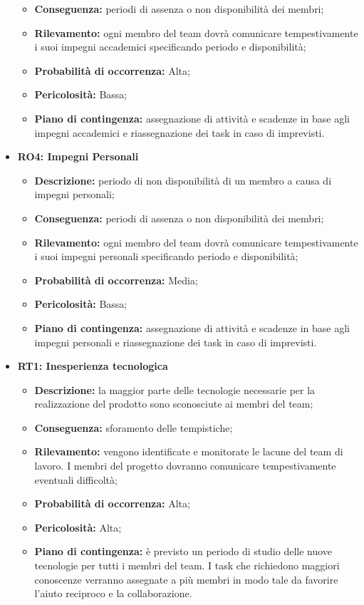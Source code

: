 \begin{itemize}
\begin{itemize}
		\item \textbf{Conseguenza:} periodi di assenza o non disponibilità dei membri;
		\item \textbf{Rilevamento:} ogni membro del team dovrà comunicare tempestivamente i suoi impegni accademici specificando periodo e disponibilità;
		\item \textbf{Probabilità di occorrenza:} Alta;
		\item \textbf{Pericolosità:} Bassa;
		\item \textbf{Piano di contingenza:} assegnazione di attività e scadenze in base agli impegni accademici e riassegnazione dei task in caso di imprevisti.
	\end{itemize}
	\item \textbf{RO4: Impegni Personali}
	\begin{itemize}
		\item \textbf{Descrizione:} periodo di non disponibilità di un membro a causa di impegni personali;
		\item \textbf{Conseguenza:} periodi di assenza o non disponibilità dei membri;
		\item \textbf{Rilevamento:} ogni membro del team dovrà comunicare tempestivamente i suoi impegni personali specificando periodo e disponibilità;
		\item \textbf{Probabilità di occorrenza:} Media;
		\item \textbf{Pericolosità:} Bassa;
		\item \textbf{Piano di contingenza:} assegnazione di attività e scadenze in base agli impegni personali e riassegnazione dei task in caso di imprevisti.
	\end{itemize}
	\item \textbf{RT1: Inesperienza tecnologica}
	\begin{itemize}
		\item \textbf{Descrizione:} la maggior parte delle tecnologie necessarie per la realizzazione del prodotto sono sconosciute ai membri del team;
		\item \textbf{Conseguenza:} sforamento delle tempistiche;
		\item \textbf{Rilevamento:} vengono identificate e monitorate le lacune del team di lavoro. I membri del progetto dovranno comunicare tempestivamente eventuali difficoltà;
		\item \textbf{Probabilità di occorrenza:} Alta;
		\item \textbf{Pericolosità:} Alta;
		\item \textbf{Piano di contingenza:} è previsto un periodo di studio delle nuove tecnologie per tutti i membri del team. I task che richiedono maggiori conoscenze verranno assegnate a più membri in modo tale da favorire l'aiuto reciproco e la collaborazione.

\end{itemize}
\end{itemize}
